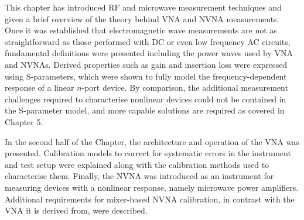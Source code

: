 \documentclass[../thesis/thesis.tex]{subfiles}
\begin{document}
This chapter has introduced RF and microwave measurement techniques and given a brief overview of the theory behind VNA and NVNA measurements. Once it was established that electromagnetic wave measurements are not as straightforward as those performed with DC or even low frequency AC circuits, fundamental definitions were presented including the power waves used by VNA and NVNAs. Derived properties such as gain and insertion loss were expressed using S-parameters, which were shown to fully model the frequency-dependent response of a linear $n$-port device. By comparison, the additional measurement challenges required to characterise nonlinear devices could not be contained in the S-parameter model, and more capable solutions are required as covered in Chapter 5.

In the second half of the Chapter, the architecture and operation of the VNA was presented. Calibration models to correct for systematic errors in the instrument and test setup were explained along with the calibration methods used to characterise them. Finally, the NVNA was introduced as an instrument for measuring devices with a nonlinear response, namely microwave power amplifiers. Additional requirements for mixer-based NVNA calibration, in contrast with the VNA it is derived from, were described.

\end{document}
